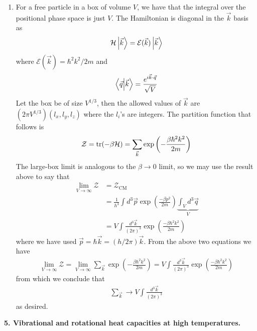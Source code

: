 \documentclass{article}
\theoremstyle{definition}
\newcommand{\ham}{\mathcal{H}}
\newcommand{\be}{\beta}
\newcommand{\f}[2]{\frac{#1}{#2}}
\newcommand{\lp}{\left(}
\newcommand{\rp}{\right)}
\begin{document}
\begin{enumerate}[label=(\alph*)]
	
	\item For a free particle in a box of volume $V$, we have that the integral over the positional phase space is just $V$. The Hamiltonian is diagonal in the $\vec{k}$ basis as
	\begin{align*}
	\ham \ket{\vec{k}} = \mathcal{E}(\vec{k}) \ket{\vec{k}} 
	\end{align*}
	where $\mathcal{E}(\vec{k}) = \hbar^2 k^2 / 2m$ and
	\begin{align*}
	\bra{\vec{q}} \ket{\vec{k}} = \f{e^{i \vec{k}\cdot \vec{q}}}{\sqrt{V}} 
	\end{align*}
	Let the box be of size $V^{1/3}$, then the allowed values of $\vec{k}$ are $(2\pi V^{1/3}) (l_x,l_y,l_z)$ where the $l_i$'s are integers. The partition function that follows is 
	\begin{align*}
	\mathcal{Z} = \tr(-\be \ham) = \sum_{\vec{k}} \exp\lp -\f{\be \hbar^2 k^2}{2m} \rp
	\end{align*}
	The large-box limit is analogous to the $\be \to 0$ limit, so we may use the result above to say that
	\begin{align*}
	\lim_{V\to \infty}\mathcal{Z} 
	&= \mathcal{Z}_\text{CM} \\
	&= \f{1}{h^3} \int d^3 \vec{p} \exp\lp \f{-\be p^2}{2m}\rp   \underbrace{{\int_V d^3\vec{q}}}_{V} \\
	&= V \int \f{ d^3 \vec{k}}{(2\pi)^3} \exp\lp \f{-\be \hbar^2 k^2}{2m} \rp
	\end{align*}
	where we have used $\vec{p} = \hbar \vec{k} = (h/2\pi) \vec{k}$. From the above two equations we have
	\begin{align*}
	\lim_{V\to \infty} \mathcal{Z}= \lim_{V\to \infty } \sum_{\vec{k}} \exp\lp -\f{\be \hbar^2 k^2}{2m} \rp = V \int \f{ d^3 \vec{k}}{(2\pi)^3} \exp\lp \f{-\be \hbar^2 k^2}{2m} \rp
	\end{align*}
	from which we conclude that
	\begin{align*}
	\sum_{\vec{k}} \to V \int \f{d^3\vec{k}}{(2\pi)^3}
	\end{align*}
	as desired. 
\end{enumerate}

\noindent \textbf{5. Vibrational and rotational heat capacities at high temperatures.}
\end{document}
